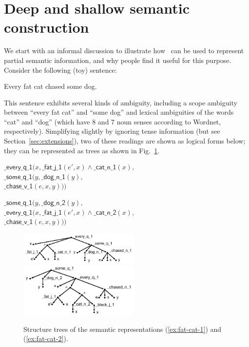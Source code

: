 \newcommand{\sem}[1]{\mathsf{#1}}
\newcommand{\sempred}[1]{\mathrm{#1}}

\section{Deep and shallow semantic construction}
\label{sec:motivation}

We start with an informal discussion to 
illustrate how \rmrs\ can be used to represent partial
semantic information, and why people find it useful for this purpose.
Consider the following (toy) sentence:
\begin{examples}
  \item Every fat cat chased some dog.
\end{examples}

This sentence exhibits several kinds of ambiguity, including a scope
ambiguity between ``every fat cat'' and ``some dog'' and lexical
ambiguities of the words ``cat'' and ``dog'' (which have 8 and 7 noun
senses according to Wordnet, respectively).  Simplifying slightly by
ignoring tense information (but see
Section~\ref{sec:extensions}), two of these readings are
shown as logical forms below; they can be represented as trees as
shown in Fig.~\ref{fig:1}.  

\begin{examples}
\item $\sem{\_every\_q\_1}(x, \sem{\_fat\_j\_1}(e',x) \wedge
    \sem{\_cat\_n\_1}(x),$\\
\hspace*{0.1in} $\sem{\_some\_q\_1}(y, \sem{\_dog\_n\_1}(y),$\\
\hspace*{0.2in}$\sem{\_chase\_v\_1}(e,x,y)))$
\label{ex:fat-cat-1}
\item $\sem{\_some\_q\_1}(y, \sem{\_dog\_n\_2}(y),$\\
\hspace*{0.1in}$\sem{\_every\_q\_1}(x, \sem{\_fat\_j\_1}(e',x) \wedge
    \sem{\_cat\_n\_2}(x), $\\
\hspace*{0.2in}$\sem{\_chase\_v\_1}(e,x,y)))$
\label{ex:fat-cat-2}
\end{examples}


\begin{figure}[t]
\includegraphics[width=6cm]{pic-cat-chased-dog}
\hspace{1cm}
\includegraphics[width=6cm]{pic-cat-chased-dog-2}
\caption{Structure trees of the semantic representations (\ref{ex:fat-cat-1}) and
  (\ref{ex:fat-cat-2}). \label{fig:1}}
\end{figure}


